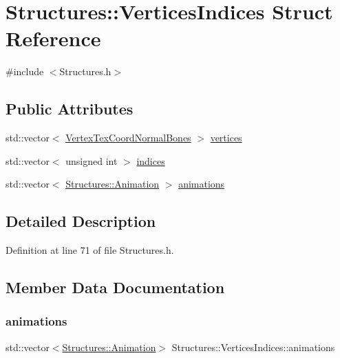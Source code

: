 \hypertarget{struct_structures_1_1_vertices_indices}{}\section{Structures\+:\+:Vertices\+Indices Struct Reference}
\label{struct_structures_1_1_vertices_indices}


{\ttfamily \#include $<$Structures.\+h$>$}

\subsection*{Public Attributes}
\begin{DoxyCompactItemize}
\item 
std\+::vector$<$ \mbox{\hyperlink{struct_structures_1_1_vertex_tex_coord_normal_bones}{Vertex\+Tex\+Coord\+Normal\+Bones}} $>$ \mbox{\hyperlink{struct_structures_1_1_vertices_indices_a17a49029b0b00cbf9a0670033b338e10}{vertices}}
\item 
std\+::vector$<$ unsigned int $>$ \mbox{\hyperlink{struct_structures_1_1_vertices_indices_a7763f6218cd1e0dda0c0e52444a62b37}{indices}}
\item 
std\+::vector$<$ \mbox{\hyperlink{struct_structures_1_1_animation}{Structures\+::\+Animation}} $>$ \mbox{\hyperlink{struct_structures_1_1_vertices_indices_a3c1b7c206b7b84899cd24fff9e5734f3}{animations}}
\end{DoxyCompactItemize}


\subsection{Detailed Description}


Definition at line 71 of file Structures.\+h.



\subsection{Member Data Documentation}
\mbox{\label{struct_structures_1_1_vertices_indices_a3c1b7c206b7b84899cd24fff9e5734f3}} 
\subsubsection{\texorpdfstring{animations}{animations}}
{\footnotesize\ttfamily std\+::vector$<$\mbox{\hyperlink{struct_structures_1_1_animation}{Structures\+::\+Animation}}$>$ Structures\+::\+Vertices\+Indices\+::animations}



